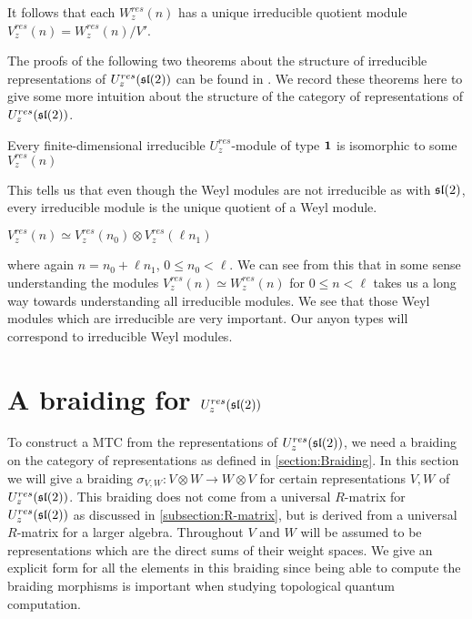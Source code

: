It follows that each $W_z^{res}(n)$ has a unique irreducible quotient module
$V_z^{res}(n) = W_z^{res}(n) / V'$. 

The proofs of the following two theorems about the structure of irreducible
representations of $U_z^{res}(\mathfrak{sl}(2))$ can be found in \cite{CP}. We record
these theorems here to give some more intuition about the structure of the
category of representations of $U_z^{res}(\mathfrak{sl}(2))$.
\begin{theorem}
Every finite-dimensional irreducible $U_z^{res}$-module of type $\mathbf{1}$ is isomorphic to some $V_z^{res}(n)$
\end{theorem}

This tells us that even though the Weyl modules are not irreducible as with
$\mathfrak{sl}(2)$, every irreducible module is the unique quotient of a Weyl module.

\begin{theorem}
$V_z^{res}(n) \simeq V_z^{res}(n_0) \otimes V_{z}^{res}(\ell n_1)$
\end{theorem}

where again $n = n_0 + \ell n_1$, $0 \leq n_0 < \ell$.
We can see from this that in some sense understanding the modules $V_z^{res}(n)
\simeq W_z^{res}(n)$ for $0 \leq n < \ell$ takes us a long way towards
understanding all irreducible modules. We see that those Weyl modules which are
irreducible are very important. Our anyon types will correspond to irreducible
Weyl modules.

\section{A braiding for $U_z^{res}(\mathfrak{sl}(2))$}
\label{section:braiding}

To construct a MTC from the representations of $U_z^{res}(\mathfrak{sl}(2))$, we need a
braiding on the category of representations as defined in
\ref{section:Braiding}.  In this section we will give a braiding $\sigma_{V,W}:
V \otimes W \to W \otimes V$ for certain representations $V,W$ of
$U_z^{res}(\mathfrak{sl}(2))$.  This braiding does not
come from a universal $R$-matrix for $U_z^{res}(\mathfrak{sl}(2))$ as discussed in
\ref{subsection:R-matrix}, but is derived from a universal $R$-matrix for a
larger algebra. Throughout $V$ and $W$ will be assumed to be representations
which are the direct sums of their weight spaces. We give an explicit form for
all the elements in this braiding since being able to compute the braiding
morphisms is important when studying topological quantum computation.

